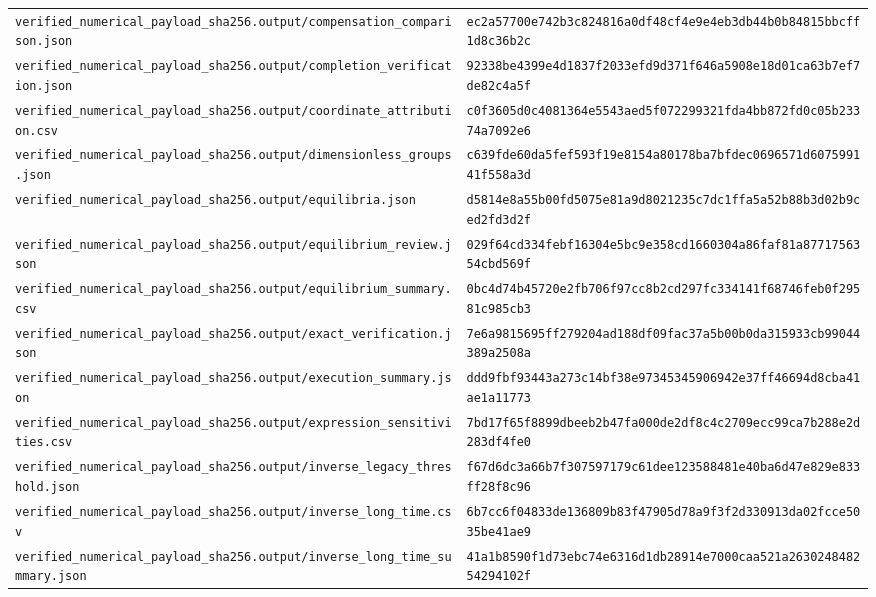 \begin{longtable}{p{.46\linewidth}p{.46\linewidth}}
\nolinkurl{verified_numerical_payload_sha256.output/compensation_comparison.json} & \nolinkurl{ec2a57700e742b3c824816a0df48cf4e9e4eb3db44b0b84815bbcff1d8c36b2c} \\
\nolinkurl{verified_numerical_payload_sha256.output/completion_verification.json} & \nolinkurl{92338be4399e4d1837f2033efd9d371f646a5908e18d01ca63b7ef7de82c4a5f} \\
\nolinkurl{verified_numerical_payload_sha256.output/coordinate_attribution.csv} & \nolinkurl{c0f3605d0c4081364e5543aed5f072299321fda4bb872fd0c05b23374a7092e6} \\
\nolinkurl{verified_numerical_payload_sha256.output/dimensionless_groups.json} & \nolinkurl{c639fde60da5fef593f19e8154a80178ba7bfdec0696571d607599141f558a3d} \\
\nolinkurl{verified_numerical_payload_sha256.output/equilibria.json} & \nolinkurl{d5814e8a55b00fd5075e81a9d8021235c7dc1ffa5a52b88b3d02b9ced2fd3d2f} \\
\nolinkurl{verified_numerical_payload_sha256.output/equilibrium_review.json} & \nolinkurl{029f64cd334febf16304e5bc9e358cd1660304a86faf81a8771756354cbd569f} \\
\nolinkurl{verified_numerical_payload_sha256.output/equilibrium_summary.csv} & \nolinkurl{0bc4d74b45720e2fb706f97cc8b2cd297fc334141f68746feb0f29581c985cb3} \\
\nolinkurl{verified_numerical_payload_sha256.output/exact_verification.json} & \nolinkurl{7e6a9815695ff279204ad188df09fac37a5b00b0da315933cb99044389a2508a} \\
\nolinkurl{verified_numerical_payload_sha256.output/execution_summary.json} & \nolinkurl{ddd9fbf93443a273c14bf38e97345345906942e37ff46694d8cba41ae1a11773} \\
\nolinkurl{verified_numerical_payload_sha256.output/expression_sensitivities.csv} & \nolinkurl{7bd17f65f8899dbeeb2b47fa000de2df8c4c2709ecc99ca7b288e2d283df4fe0} \\
\nolinkurl{verified_numerical_payload_sha256.output/inverse_legacy_threshold.json} & \nolinkurl{f67d6dc3a66b7f307597179c61dee123588481e40ba6d47e829e833ff28f8c96} \\
\nolinkurl{verified_numerical_payload_sha256.output/inverse_long_time.csv} & \nolinkurl{6b7cc6f04833de136809b83f47905d78a9f3f2d330913da02fcce5035be41ae9} \\
\nolinkurl{verified_numerical_payload_sha256.output/inverse_long_time_summary.json} & \nolinkurl{41a1b8590f1d73ebc74e6316d1db28914e7000caa521a263024848254294102f} \\

\end{longtable}
